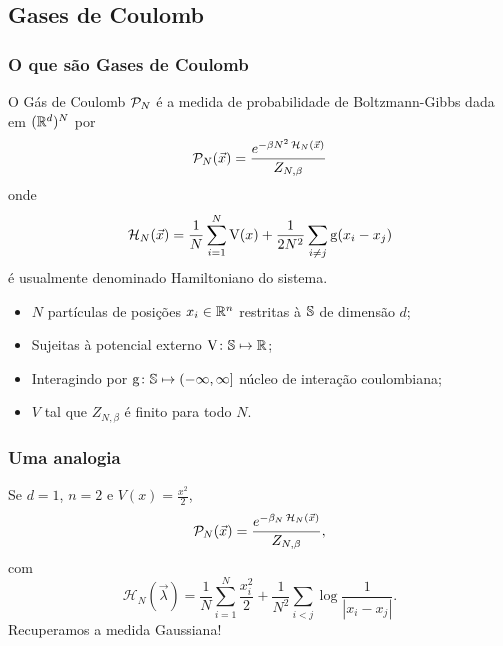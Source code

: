 \subsection{Gases de Coulomb}
\begin{frame}
	\frametitle{O que são Gases de Coulomb}
	O Gás de Coulomb $\mathcal{P}_N$ é a medida de probabilidade de Boltzmann-Gibbs dada em $(\mathbb{R}^d)^N$ por
	\[
		\mathcal{P}_N(\vec{x}) = \frac{e^{-\beta N^2 \operatorname{\mathcal{H}}_N(\vec{x})}}{Z_{N,\beta}}
	\] 
	onde 
	\[
		\operatorname{\mathcal{H}}_N(\vec{x}) = \frac{1}{N} \sum_{i = 1}^{N} \operatorname{V}(x) + \frac{1}{2N^2} \sum_{i \neq j} \operatorname{g}(x_i - x_j)
	\]
	é usualmente denominado Hamiltoniano do sistema. \cite{ChafaCoulombMeasure}
\end{frame}
\begin{frame}
	\begin{itemize}
	\item $N$ partículas de posições $x_i \in \mathbb{R}^n$ restritas à $\mathbb{S}$ de dimensão $d$;
	\pause
	\item Sujeitas à potencial externo $\operatorname{V} \colon \mathbb{S} \mapsto \mathbb{R}$;
	\pause
	\item Interagindo por $\operatorname{g} \colon \mathbb{S} \mapsto (-\infty, \infty]$ núcleo de interação coulombiana;
	\pause
	\item $V$ tal que  $Z_{N, \beta}$ é finito para todo $N$.
	\end{itemize}
\end{frame}
\begin{frame}
	\frametitle{Uma analogia}	
	Se $d = 1$, $n=2$ e $V(x) = \frac{x^2}{2}$,
	\pause
	\[
	\mathcal{P}_N(\vec{x}) = \frac{e^{-\beta_N \operatorname{\mathcal{H}}_N(\vec{x})}}{Z_{N,\beta}},
	\]
	com 
	\[
	\mathcal{H}_N(\vec{\lambda}) = \frac{1}{N}\sum_{i = 1}^{N} \frac{x_i^2}{2} + \frac{1}{N^2} \sum_{i < j} \log{\frac{1}{|x_i - x_j|}}.
	\]
	Recuperamos a medida Gaussiana!
\end{frame}

